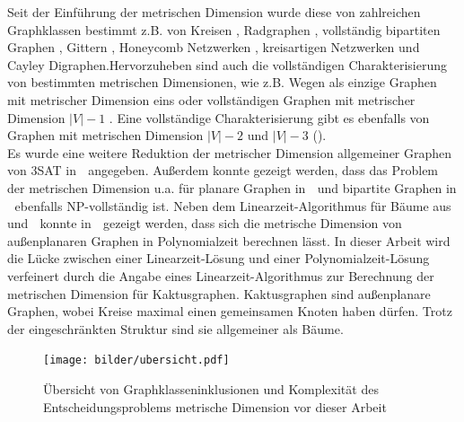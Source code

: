 Seit der Einführung der metrischen Dimension wurde diese von zahlreichen Graphklassen bestimmt z.B. von Kreisen \cite{landmarks}, Radgraphen \cite{wheel}, vollständig bipartiten Graphen \cite{upper}, Gittern \cite{landmarks}, Honeycomb Netzwerken \cite{honey}, kreisartigen Netzwerken \cite{circulant} und Cayley Digraphen\cite{cayley}.\vspace{-1.5mm}\newline\newline Hervorzuheben sind auch die vollständigen Charakterisierung von bestimmten metrischen Dimensionen, wie z.B. Wegen als einzige Graphen mit metrischer Dimension eins\cite{landmarks} oder vollständigen Graphen mit metrischer Dimension $|V|-1$ \cite{upper}. 
Eine vollständige Charakterisierung gibt es ebenfalls von Graphen mit metrischen Dimension $|V|-2$ \cite{upper} und $|V|-3$ (\cite{n-31,n-32}).\\
Es wurde eine weitere Reduktion der metrischer Dimension allgemeiner Graphen von 3SAT in \grqq$\;$\cite{landmarks} angegeben. Außerdem konnte gezeigt werden, dass das Problem der metrischen Dimension u.a. für planare Graphen in \grqq$\;$\cite{aussenplanar} und bipartite Graphen in \grqq$\;$\cite{bipartitnp} ebenfalls NP-vollständig ist. 
Neben dem Linearzeit-Algorithmus für Bäume aus \grqq$\;$\cite{harary} und \grqq$\;$\cite{landmarks} konnte in \grqq$\;$\cite{aussenplanar} gezeigt werden, dass sich die metrische Dimension von außenplanaren Graphen in Polynomialzeit berechnen lässt.\vspace{-1mm}\newline\newline
In dieser Arbeit wird die Lücke zwischen einer Linearzeit-Lösung und einer Polynomialzeit-Lösung verfeinert durch die Angabe eines Linearzeit-Algorithmus zur Berechnung der metrischen Dimension für Kaktusgraphen. Kaktusgraphen sind außenplanare Graphen, wobei Kreise maximal einen gemeinsamen Knoten haben dürfen. Trotz der eingeschränkten Struktur sind sie allgemeiner als Bäume.
\vspace{-3mm}
\newline
\begin{figure}[h]
\centering
\texttt{[image: bilder/ubersicht.pdf]}
\caption{Übersicht von Graphklasseninklusionen und Komplexität des Entscheidungsproblems metrische Dimension vor dieser Arbeit}
\end{figure}
